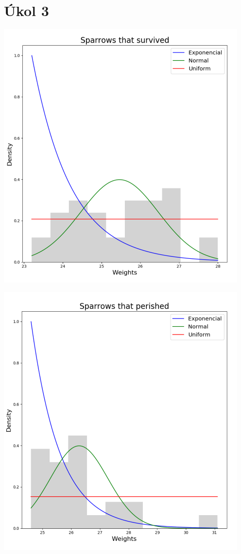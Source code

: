 \documentclass[12pt,a4paper]{article}
\begin{document}
\section{Úkol 3}
\begin{center}
\includegraphics[width=5in]{3_survived}
\end{center}
\begin{center}
\includegraphics[width=5in]{3_died}
\end{center}
\end{document}
